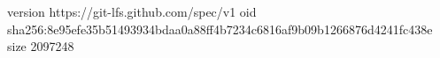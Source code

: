 version https://git-lfs.github.com/spec/v1
oid sha256:8e95efe35b51493934bdaa0a88ff4b7234c6816af9b09b1266876d4241fc438e
size 2097248
